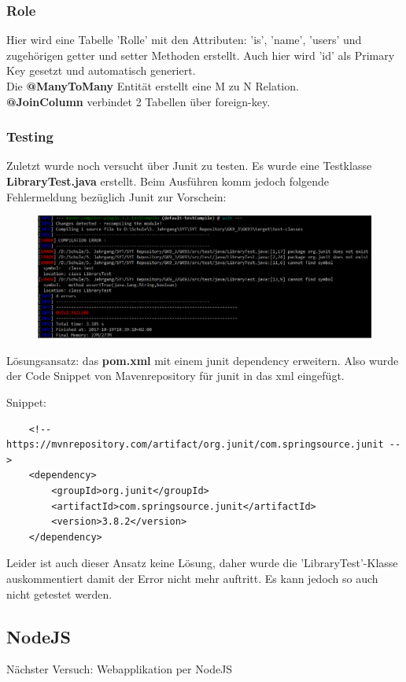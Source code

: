 \subsubsection{Role}
Hier wird eine Tabelle 'Rolle' mit den Attributen: 'is', 'name', 'users' und zugehörigen getter und setter Methoden erstellt.
Auch hier wird 'id' als Primary Key gesetzt und automatisch generiert. 
\\Die \textbf{@ManyToMany} Entität erstellt eine M zu N Relation.
\\ \textbf{@JoinColumn} verbindet 2 Tabellen über foreign-key.


\subsubsection{Testing}
Zuletzt wurde noch versucht über Junit zu testen. Es wurde eine Testklasse \textbf{LibraryTest.java} erstellt. Beim Ausführen komm jedoch folgende Fehlermeldung bezüglich Junit zur Vorschein:

\begin{figure}[!h]
	\begin{center}
		\includegraphics[width=0.8\linewidth]{images/junitError.PNG}
	\end{center}
\end{figure}

Lösungsansatz: das \textbf{pom.xml} mit einem junit dependency erweitern.
Also wurde der Code Snippet von Mavenrepository für junit in das xml eingefügt.

Snippet:
\begin{lstlisting}
	<!-- https://mvnrepository.com/artifact/org.junit/com.springsource.junit -->
	<dependency>
		<groupId>org.junit</groupId>
		<artifactId>com.springsource.junit</artifactId>
		<version>3.8.2</version>
	</dependency>
\end{lstlisting}

Leider ist auch dieser Ansatz keine Lösung, daher wurde die 'LibraryTest'-Klasse auskommentiert damit der Error nicht mehr auftritt.
Es kann jedoch so auch nicht getestet werden.

\clearpage
\subsection{NodeJS}
Nächster Versuch: Webapplikation per NodeJS

